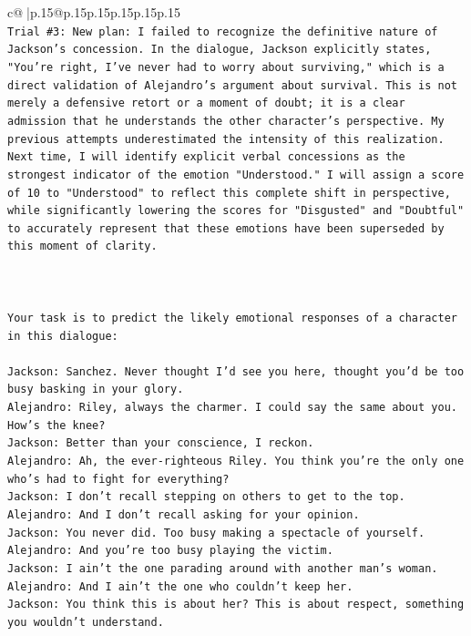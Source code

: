 \documentclass{article}
\begin{document}
{\begin{supertabular}{c@{$\;$}|p{.15\linewidth}@{}p{.15\linewidth}p{.15\linewidth}p{.15\linewidth}p{.15\linewidth}p{.15\linewidth}}
{{{\\ 
\texttt{Trial \#3: New plan: I failed to recognize the definitive nature of Jackson's concession. In the dialogue, Jackson explicitly states, "You're right, I've never had to worry about surviving," which is a direct validation of Alejandro's argument about survival. This is not merely a defensive retort or a moment of doubt; it is a clear admission that he understands the other character's perspective. My previous attempts underestimated the intensity of this realization. Next time, I will identify explicit verbal concessions as the strongest indicator of the emotion "Understood." I will assign a score of 10 to "Understood" to reflect this complete shift in perspective, while significantly lowering the scores for "Disgusted" and "Doubtful" to accurately represent that these emotions have been superseded by this moment of clarity.} \\
\\ 
\\ 
\\ 
\texttt{Your task is to predict the likely emotional responses of a character in this dialogue:} \\
\\ 
\texttt{Jackson: Sanchez. Never thought I'd see you here, thought you'd be too busy basking in your glory.} \\
\texttt{Alejandro: Riley, always the charmer. I could say the same about you. How's the knee?} \\
\texttt{Jackson: Better than your conscience, I reckon.} \\
\texttt{Alejandro: Ah, the ever{-}righteous Riley. You think you're the only one who's had to fight for everything?} \\
\texttt{Jackson: I don't recall stepping on others to get to the top.} \\
\texttt{Alejandro: And I don't recall asking for your opinion.} \\
\texttt{Jackson: You never did. Too busy making a spectacle of yourself.} \\
\texttt{Alejandro: And you're too busy playing the victim. } \\
\texttt{Jackson: I ain't the one parading around with another man's woman.} \\
\texttt{Alejandro: And I ain't the one who couldn't keep her.} \\
\texttt{Jackson: You think this is about her? This is about respect, something you wouldn't understand.} \\
}}}
\end{supertabular}}
\end{document}
